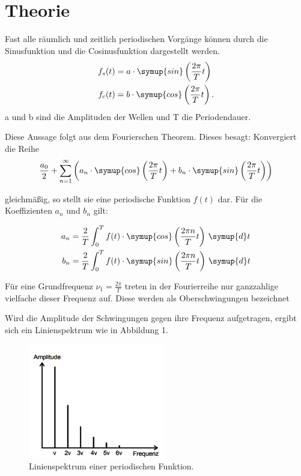 \section{Theorie}
\label{sec:Theorie}

Fast alle räumlich und zeitlich periodischen Vorgänge können durch die Sinusfunktion
und die Cosinusfunktion dargestellt werden.
\begin{align}
  f_s(t) &= a \cdot \symup{sin}\left(\frac{2\pi}{T}t\right) \\
  f_c(t) &= b \cdot \symup{cos}\left(\frac{2\pi}{T}t\right).
\end{align}
a und b sind die Amplituden der Wellen und T die Periodendauer.

Diese Aussage folgt aus dem Fourierschen Theorem. Dieses besagt: Konvergiert die Reihe
\begin{equation}
  \frac{a_0}{2} + \sum_{n=1}^\infty \left(a_n \cdot \symup{cos}\left(\frac{2\pi}{T}t\right) + b_n \cdot \symup{sin}\left(\frac{2\pi}{T}t\right) \right)
\end{equation}

gleichmäßig, so stellt sie eine periodische Funktion $f(t)$ dar. Für die Koeffizienten $a_n$ und $b_n$ gilt:

\begin{align}
  a_n &= \frac{2}{T} \int_{0}^{T} f(t) \cdot \symup{cos}\left(\frac{2\pi n}{T}t\right) \, \symup{d}t \\
  b_n &= \frac{2}{T} \int_{0}^{T} f(t) \cdot \symup{sin}\left(\frac{2\pi n}{T}t\right) \, \symup{d}t
\end{align}

Für eine Grundfrequenz $\nu_1 = \frac{2\pi}{T}$ treten in der Fourierreihe nur ganzzahlige vielfache dieser
Frequenz auf. Diese werden als Oberschwingungen bezeichnet

Wird die Amplitude der Schwingungen gegen ihre Frequenz aufgetragen, ergibt sich ein
Linienspektrum wie in Abbildung 1.

\begin{figure}[H]
  \centering
  \includegraphics[height=5cm]{Linienspektrum.PNG}
  \caption{Linienspektrum einer periodischen Funktion. \cite{sample}}
  \label{fig:Linienspektrum}
\end{figure}

